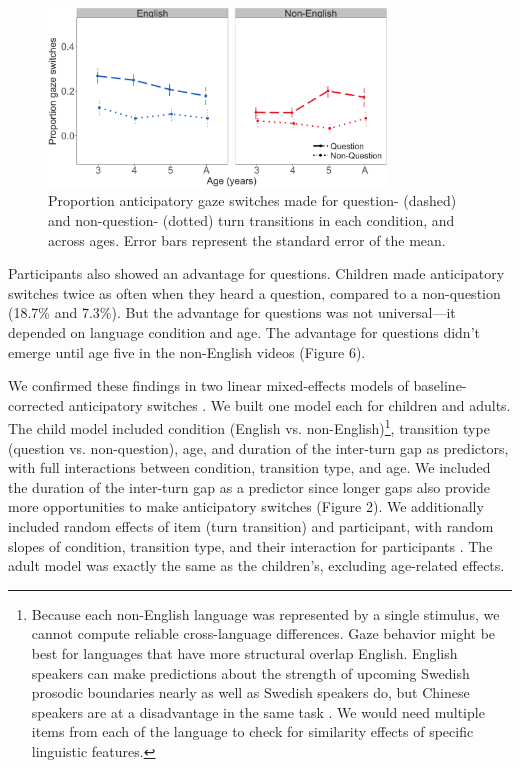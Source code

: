 \documentclass[authoryear, 12pt]{elsarticle}
\begin{document}
\begin{figure}[H]
\begin{center}
\includegraphics[width=0.8\textwidth]{figures/FIG-QvsNQ-FL.png}
\end{center}
\caption{Proportion anticipatory gaze switches made for question- (dashed) and non-question- (dotted) turn transitions in each condition, and across ages. Error bars represent the standard error of the mean.} 
\label{questionsFL}
\end{figure}

Participants also showed an advantage for questions. Children made anticipatory switches twice as often when they heard a question, compared to a non-question (18.7\% and 7.3\%). But the advantage for questions was not universal---it depended on language condition and age. The advantage for questions didn't emerge until age five in the non-English videos (Figure 6).

We confirmed these findings in two linear mixed-effects models of baseline-corrected anticipatory switches \citep{lme4, R}. We built one model each for children and adults. The child model included condition (English vs. non-English)\footnote{Because each non-English language was represented by a single stimulus, we cannot compute reliable cross-language differences. Gaze behavior might be best for languages that have more structural overlap English. English speakers can make predictions about the strength of upcoming Swedish prosodic boundaries nearly as well as Swedish speakers do, but Chinese speakers are at a disadvantage in the same task \cite{carlson2005}. We would need multiple items from each of the language to check for similarity effects of specific linguistic features.}, transition type (question vs. non-question), age, and duration of the inter-turn gap as predictors, with full interactions between condition, transition type, and age.  We included the duration of the inter-turn gap as a predictor since longer gaps also provide more opportunities to make anticipatory switches (Figure 2). We additionally included random effects of item (turn transition) and participant, with random slopes of condition, transition type, and their interaction for participants \citep{barr2013}. The adult model was exactly the same as the children's, excluding age-related effects.
\end{document}

